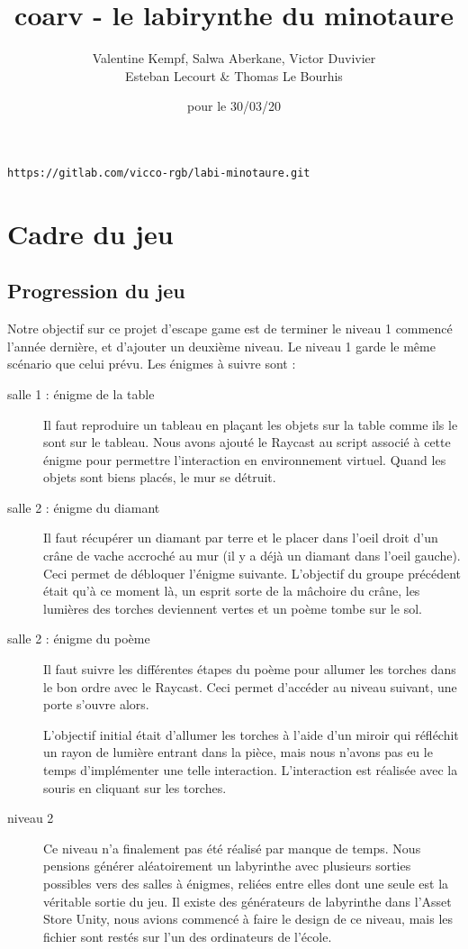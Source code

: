 \documentclass[12pt]{article}
\title{coarv - le labirynthe du minotaure}
\author{Valentine Kempf, Salwa Aberkane, Victor Duvivier \\ Esteban Lecourt \& Thomas Le Bourhis}
\date{pour le 30/03/20}
\begin{document}
\maketitle
\noindent{}
\begin{center}
    \verb!https://gitlab.com/vicco-rgb/labi-minotaure.git!
\end{center}
\newpage

\tableofcontents

\section{Cadre du jeu}
\subsection{Progression du jeu}
Notre objectif sur ce projet d’escape game est de terminer le niveau 1 commencé l’année dernière, et d’ajouter un deuxième niveau. Le niveau 1 garde le même scénario que celui prévu. Les énigmes à suivre sont :
\begin{description}
    \item[salle 1 : énigme de la table] Il faut reproduire un tableau en plaçant les objets sur la table comme ils le sont sur le tableau. Nous avons ajouté le Raycast au script associé à cette énigme pour permettre l’interaction en environnement virtuel. Quand les objets sont biens placés, le mur se détruit.
    \item[salle 2 : énigme du diamant] Il faut récupérer un diamant par terre et le placer dans l’oeil droit d’un crâne de vache accroché au mur (il y a déjà un diamant dans l’oeil gauche). Ceci permet de débloquer l’énigme suivante. L’objectif du groupe précédent était qu’à ce moment là, un esprit sorte de la mâchoire du crâne, les lumières des torches deviennent vertes et un poème tombe sur le sol.
    \item[salle 2 : énigme du poème] Il faut suivre les différentes étapes du poème pour allumer les torches dans le bon ordre avec le Raycast. Ceci permet d’accéder au niveau suivant, une porte s’ouvre alors.

    L’objectif initial était d’allumer les torches à l’aide d’un miroir qui réfléchit un rayon de lumière entrant dans la pièce, mais nous n’avons pas eu le temps d’implémenter une telle interaction. L’interaction est réalisée avec la souris en cliquant sur les torches.
    \item[niveau 2] Ce niveau n’a finalement pas été réalisé par manque de temps. Nous pensions générer aléatoirement un labyrinthe avec plusieurs sorties possibles vers des salles à énigmes, reliées entre elles dont une seule est la véritable sortie du jeu. Il existe des générateurs de labyrinthe dans l’Asset Store Unity, nous avions commencé à faire le design de ce niveau, mais les  fichier sont restés sur l’un des ordinateurs de l’école.
\end{description}
\end{document}

